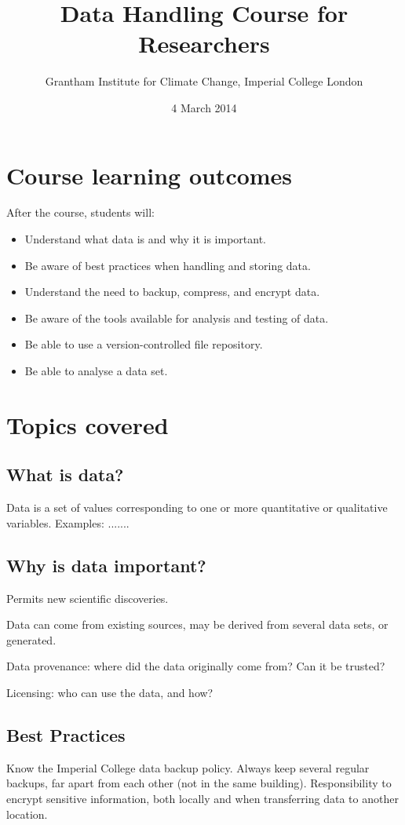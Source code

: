 \documentclass[a4paper,11pt]{article}
\title{Data Handling Course for Researchers}
\date{4 March 2014}
\author{Grantham Institute for Climate Change, Imperial College London}
\begin{document}
\maketitle
\setlength{\parskip}{0.3cm}
\setlength{\parindent}{0cm}

\section{Course learning outcomes}
After the course, students will:
\begin{itemize}
   \item Understand what data is and why it is important.
   \item Be aware of best practices when handling and storing data.
   \item Understand the need to backup, compress, and encrypt data.
   \item Be aware of the tools available for analysis and testing of data.
   \item Be able to use a version-controlled file repository.
   \item Be able to analyse a data set.
\end{itemize}

\section{Topics covered}

\subsection{What is data?}
Data is a set of values corresponding to one or more quantitative or qualitative variables. Examples: .......

\subsection{Why is data important?}
Permits new scientific discoveries.

Data can come from existing sources, may be derived from several data sets, or generated.

Data provenance: where did the data originally come from? Can it be trusted?

Licensing: who can use the data, and how?

\subsection{Best Practices}
Know the Imperial College data backup policy.
Always keep several regular backups, far apart from each other (not in the same building).
Responsibility to encrypt sensitive information, both locally and when transferring data to another location.
\end{document}
